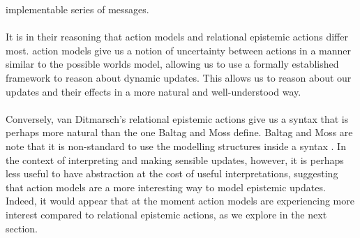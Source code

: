implementable series of messages.\\
\\
It is in their reasoning that action models and relational epistemic actions
differ most.
action models give us a notion of uncertainty between actions in a manner
similar to the possible worlds model, allowing us to use a formally established framework
to reason about dynamic updates.
This allows us to reason about our updates and their effects in a more natural
and well-understood way.\\
\\
Conversely, van Ditmarsch's relational epistemic actions give us a syntax that
is perhaps more natural than the one Baltag and Moss define.
Baltag and Moss are note that it is non-standard to use the modelling structures
inside a syntax \cite{baltag2005programs}.
In the context of interpreting and making sensible updates, however, it is
perhaps less useful to have abstraction at the cost of useful interpretations,
suggesting that action models are a more interesting way to model epistemic
updates.
Indeed, it would appear that at the moment action models are experiencing more
interest compared to relational epistemic actions, as we explore in the next
section.

